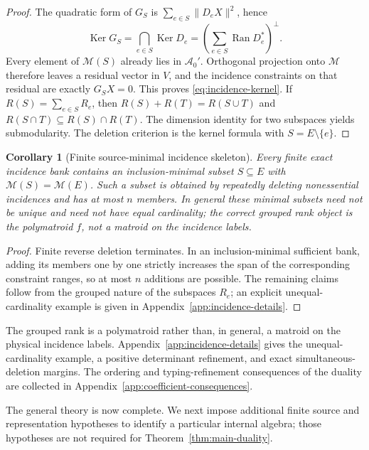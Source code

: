 \documentclass[11pt]{article}
\numberwithin{equation}{section}
\newtheorem{corollary}[theorem]{Corollary}
\theoremstyle{definition}
\theoremstyle{remark}
\newcommand{\Ker}{\operatorname{Ker}}
\newcommand{\Ran}{\operatorname{Ran}}
\newcommand{\M}{\mathcal M}
\begin{document}
\begin{proof}
The quadratic form of $G_S$ is
$\sum_{e\in S}\|D_eX\|^2$, hence
\[
 \Ker G_S=\bigcap_{e\in S}\Ker D_e
 =\left(\sum_{e\in S}\Ran D_e^*\right)^\perp.
\]
Every element of $\M(S)$ already lies in $\mathcal A_0'$.  Orthogonal
projection onto $\M$ therefore leaves a residual vector in $V$, and the
incidence constraints on that residual are exactly $G_SX=0$.  This proves
\eqref{eq:incidence-kernel}.  If $R(S)=\sum_{e\in S}R_e$, then
$R(S)+R(T)=R(S\cup T)$ and
$R(S\cap T)\subseteq R(S)\cap R(T)$.  The dimension identity for two
subspaces yields submodularity.  The deletion criterion is the kernel formula
with $S=E\setminus\{e\}$.
\end{proof}

\begin{corollary}[Finite source-minimal incidence skeleton]
\label{cor:minimal-incidence-skeleton}
Every finite exact incidence bank contains an inclusion-minimal subset
$S\subseteq E$ with $\M(S)=\M(E)$.  Such a subset is obtained by repeatedly
deleting nonessential incidences and has at most $n$ members.  In general
these minimal subsets need not be unique and need not have equal cardinality;
the correct grouped rank object is the polymatroid $f$, not a matroid on the
incidence labels.
\end{corollary}

\begin{proof}
Finite reverse deletion terminates.  In an inclusion-minimal sufficient bank,
adding its members one by one strictly increases the span of the corresponding
constraint ranges, so at most $n$ additions are possible.  The remaining
claims follow from the grouped nature of the subspaces $R_e$; an explicit
unequal-cardinality example is given in Appendix~\ref{app:incidence-details}.
\end{proof}

The grouped rank is a polymatroid rather than, in general, a matroid on the
physical incidence labels.  Appendix~\ref{app:incidence-details} gives the
unequal-cardinality example, a positive determinant refinement, and exact
simultaneous-deletion margins.  The ordering and typing-refinement
consequences of the duality are collected in
Appendix~\ref{app:coefficient-consequences}.

The general theory is now complete.  We next impose additional finite
source and representation hypotheses to identify a particular internal
algebra; those hypotheses are not required for Theorem~\ref{thm:main-duality}.
\end{document}
